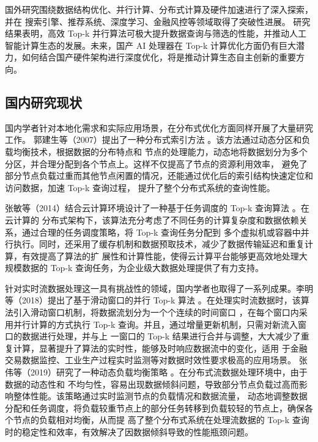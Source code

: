 国外研究围绕数据结构优化、并行计算、分布式计算及硬件加速进行了深入探索，并在 搜索引擎、推荐系统、深度学习、金融风控等领域取得了突破性进展。
研究结果表明，高效 Top-k 并行算法可极大提升数据查询与筛选的性能，并推动人工智能计算生态的发展。未来，国产 AI 处理器在 Top-k 计算优化方面仍有巨大潜力，如何结合国产硬件架构进行深度优化，将是推动计算生态自主创新的重要方向。



\subsection{国内研究现状}

国内学者针对本地化需求和实际应用场景，在分布式优化方面同样开展了大量研究工作。
郭建生等（2007）提出了一种分布式索引方法 \cite {guo2007}。该方法通过动态分区和负载均衡技术，根据数据的分布特点和
节点的处理能力，动态地将数据划分为多个分区，并合理分配到各个节点上。这样不仅提高了节点的资源利用效率，
避免了部分节点负载过重而其他节点闲置的情况，还能通过优化后的索引结构快速定位和访问数据，加速 Top-k 查询过程，
提升了整个分布式系统的查询性能。

张敏等（2014）结合云计算环境设计了一种基于任务调度的 Top-k 查询算法 \cite {zhang2014}。在云计算的
分布式架构下，该算法充分考虑了不同任务的计算复杂度和数据依赖关系，通过合理的任务调度策略，将 Top-k 查询任务分配到
多个虚拟机或容器中并行执行。同时，还采用了缓存机制和数据预取技术，减少了数据传输延迟和重复计算，有效提高了算法的扩
展性和计算性能，使得云计算平台能够更高效地处理大规模数据的 Top-k 查询任务，为企业级大数据处理提供了有力支持。

针对实时流数据处理这一具有挑战性的领域，国内学者也取得了一系列成果。李明等（2018）提出了基于滑动窗口的并行 Top-k
 算法 \cite {li2018}。在处理实时流数据时，该算法引入滑动窗口机制，将数据流划分为一个个连续的时间窗口
 ，在每个窗口内采用并行计算的方式执行 Top-k 查询。并且，通过增量更新机制，只需对新流入窗口的数据进行处理，并与上
 一窗口的 Top-k 结果进行合并与调整，大大减少了重复计算，显著提升了算法的实时性，能够及时响应数据流中的变化，适用
 于金融交易数据监控、工业生产过程实时监测等对数据时效性要求极高的应用场景。
张伟等（2019）研究了一种动态负载均衡策略 \cite {zhang2019}。在分布式流数据处理环境中，由于数据的动态性和
不均匀性，容易出现数据倾斜问题，导致部分节点负载过高而影响整体性能。该策略通过实时监测节点的负载情况和数据流量，
动态地调整数据分配和任务调度，将负载较重节点上的部分任务转移到负载较轻的节点上，确保各个节点的负载相对均衡，从而提
高了整个分布式系统在处理流数据的 Top-k 查询时的稳定性和效率，有效解决了因数据倾斜导致的性能瓶颈问题。

